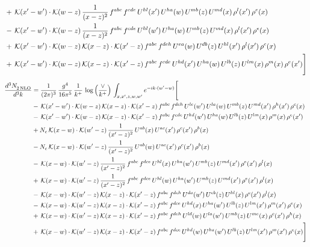 \documentclass[9pt]{article}
\numberwithin{equation}{section}
\begin{document}
\begin{align}
&+\,\mathcal{K}(x'-w')\cdot\mathcal{K}(w-z)\,\frac{1}{(x-z)^{2}}\,f^{abc}\,f^{cde}\,U^{hl}(x')\,U^{ha}(w)\,U^{mb}(z)\,U^{md}(x)\,\rho^{l}(x')\,\rho^{e}(x)\notag \\ 
&-\,\mathcal{K}(x'-w')\cdot\mathcal{K}(w-z)\,\frac{1}{(x-z)^{2}}\,f^{abc}\,f^{cde}\,U^{hl}(w')\,U^{ha}(w)\,U^{mb}(z)\,U^{md}(x)\,\rho^{l}(x')\,\rho^{e}(x)\notag \\ 
&+\,\mathcal{K}(x'-w')\cdot\mathcal{K}(w-z)\,\mathcal{K}(x-z)\cdot\mathcal{K}(x'-z)\,f^{abc}\,f^{deh}\,U^{ea}(w)\,U^{db}(z)\,U^{hl}(x')\,\rho^{l}(x')\,\rho^{c}(x)\notag \\ 
&+\,\mathcal{K}(x'-w')\cdot\mathcal{K}(w-z)\,\mathcal{K}(x-z)\cdot\mathcal{K}(x'-z)\,f^{abc}\,f^{cde}\,U^{hd}(x')\,U^{ha}(w)\,U^{lb}(z)\,U^{lm}(x)\,\rho^{m}(x)\,\rho^{e}(x')\Bigg]
\end{align}    
\begin{align}
    \frac{d^{3}N_{2\,\rm NLO}^{\rm}}{d^{3}k}  & = \frac{1}{(2\pi)^{3}}\,\frac{g^{4}}{16\pi^{5}}\,\frac{1}{k^{+}}\,\log{\left(\frac{\vee}{k^{+}}\right)}\, \int_{x,x',z,w,w'}e^{-ik\cdot(w'-w)}\Bigg[\notag\\ & -\,\mathcal{K}(x'-w')\cdot\mathcal{K}(w-z)\,\mathcal{K}(x-z)\cdot\mathcal{K}(x'-z)\,f^{abc}\,f^{deh}\,U^{le}(w')\,U^{la}(w)\,U^{mb}(z)\,U^{md}(x')\,\rho^{h}(x')\,\rho^{c}(x)\notag \\ 
&-\,\mathcal{K}(x'-w')\cdot\mathcal{K}(w-z)\,\mathcal{K}(x-z)\cdot\mathcal{K}(x'-z)\,f^{abc}\,f^{cde}\,U^{hd}(w')\,U^{ha}(w)\,U^{lb}(z)\,U^{lm}(x)\,\rho^{m}(x)\,\rho^{e}(x')\notag \\ 
&+N_{c}\,\mathcal{K}(x-w)\cdot\mathcal{K}(w'-z)\,\frac{1}{(x'-z)^{2}}\,U^{ab}(x)\,U^{ac}(x')\,\rho^{c}(x')\,\rho^{b}(x)\notag \\ 
&-N_{c}\,\mathcal{K}(x-w)\cdot\mathcal{K}(w'-z)\,\frac{1}{(x'-z)^{2}}\,U^{ab}(w)\,U^{ac}(x')\,\rho^{c}(x')\,\rho^{b}(x)\notag \\ 
&-\,\mathcal{K}(x-w)\cdot\mathcal{K}(w'-z)\,\frac{1}{(x'-z)^{2}}\,f^{abc}\,f^{dce}\,U^{hl}(x)\,U^{ha}(w')\,U^{mb}(z)\,U^{md}(x')\,\rho^{e}(x')\,\rho^{l}(x) \notag \\ & +\,\mathcal{K}(x-w)\cdot\mathcal{K}(w'-z)\,\frac{1}{(x'-z)^{2}}\,f^{abc}\,f^{dce}\,U^{hl}(w)\,U^{ha}(w')\,U^{mb}(z)\,U^{md}(x')\,\rho^{e}(x')\,\rho^{l}(x)\notag \\ 
&-\,\mathcal{K}(x-w)\cdot\mathcal{K}(w'-z)\,\mathcal{K}(x-z)\cdot\mathcal{K}(x'-z)\,f^{abc}\,f^{deh}\,U^{da}(w')\,U^{eb}(z)\,U^{hl}(x)\,\rho^{c}(x')\,\rho^{l}(x)\notag \\ 
&-\,\mathcal{K}(x-w)\cdot\mathcal{K}(w'-z)\,\mathcal{K}(x-z)\cdot\mathcal{K}(x'-z)\,f^{abc}\,f^{dce}\,U^{hd}(x)\,U^{ha}(w')\,U^{lb}(z)\,U^{lm}(x')\,\rho^{m}(x')\,\rho^{e}(x)\notag \\ 
&+\,\mathcal{K}(x-w)\cdot\mathcal{K}(w'-z)\,\mathcal{K}(x-z)\cdot\mathcal{K}(x'-z)\,f^{abc}\,f^{deh}\,U^{ld}(w)\,U^{la}(w')\,U^{mb}(z)\,U^{me}(x)\,\rho^{c}(x')\,\rho^{h}(x)\notag \\ 
&+\,\mathcal{K}(x-w)\cdot\mathcal{K}(w'-z)\,\mathcal{K}(x-z)\cdot\mathcal{K}(x'-z)\,f^{abc}\,f^{dce}\,U^{hd}(w)\,U^{ha}(w')\,U^{lb}(z)\,U^{lm}(x')\,\rho^{m}(x')\,\rho^{e}(x)\Bigg]
\end{align}    
\end{document}
